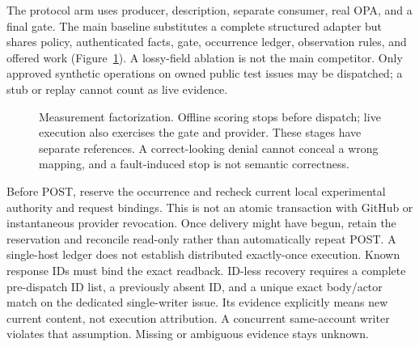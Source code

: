 \documentclass[11pt,letterpaper]{article}
\begin{document}
The protocol arm uses producer, description, separate consumer, real OPA, and
a final gate. The main baseline substitutes a complete structured adapter but
shares policy, authenticated facts, gate, occurrence ledger, observation rules,
and offered work (Figure~\ref{fig:factorization}). A lossy-field ablation is not
the main competitor. Only approved synthetic operations on owned public test
issues may be dispatched; a stub or replay cannot count as live evidence.

\begin{figure}[tbp]
\centering
\small
{}
\caption{Measurement factorization. Offline scoring stops before dispatch;
live execution also exercises the gate and provider. These stages have separate
references. A correct-looking denial cannot conceal a wrong mapping, and a
fault-induced stop is not semantic correctness.}
\label{fig:factorization}
\end{figure}

Before POST, reserve the occurrence and recheck current local experimental
authority and request bindings. This is not an atomic transaction with GitHub
or instantaneous provider revocation. Once delivery might have begun, retain
the reservation and reconcile read-only rather than automatically repeat POST.
A single-host ledger does not establish distributed exactly-once execution.
Known response IDs must bind the exact readback. ID-less recovery requires a
complete pre-dispatch ID list, a previously absent ID, and a unique exact
body/actor match on the dedicated single-writer issue. Its evidence explicitly
means new current content, not execution attribution. A concurrent same-account
writer violates that assumption. Missing or ambiguous evidence stays unknown.
\end{document}
